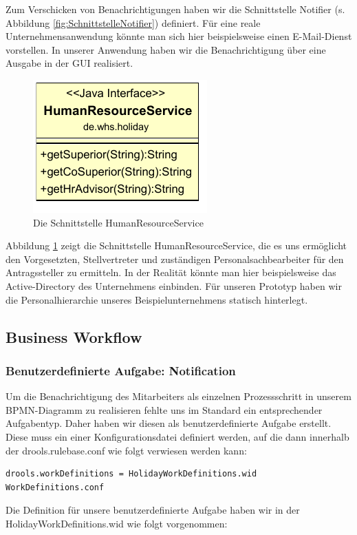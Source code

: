 Zum Verschicken von Benachrichtigungen haben wir die Schnittstelle Notifier (s. Abbildung \ref{fig:SchnittstelleNotifier}) definiert. Für eine reale Unternehmensanwendung könnte man sich hier beispielsweise einen E-Mail-Dienst vorstellen. In unserer Anwendung haben wir die Benachrichtigung über eine Ausgabe in der GUI realisiert.

\begin{figure}[H]
\centering
\includegraphics[width=0.3\linewidth]{Bilder/SchnittstelleHumanResourceService}
\caption{Die Schnittstelle HumanResourceService}
\label{fig:SchnittstelleHumanResourceService}
\end{figure}

Abbildung \ref{fig:SchnittstelleHumanResourceService} zeigt die Schnittstelle HumanResourceService, die es uns ermöglicht den Vorgesetzten, Stellvertreter und zuständigen Personalsachbearbeiter für den Antragssteller zu ermitteln. In der Realität könnte man hier beispielsweise das Active-Directory des Unternehmens einbinden. Für unseren Prototyp haben wir die Personalhierarchie unseres Beispielunternehmens statisch hinterlegt.

\subsection{Business Workflow}

\subsubsection{Benutzerdefinierte Aufgabe: Notification}
Um die Benachrichtigung des Mitarbeiters als einzelnen Prozessschritt in unserem BPMN-Diagramm zu realisieren fehlte uns im Standard ein entsprechender Aufgabentyp. Daher haben wir diesen als benutzerdefinierte Aufgabe erstellt. Diese muss ein einer Konfigurationsdatei definiert werden, auf die dann innerhalb der drools.rulebase.conf wie folgt verwiesen werden kann:
\begin{lstlisting}
drools.workDefinitions = HolidayWorkDefinitions.wid WorkDefinitions.conf
\end{lstlisting}

Die Definition für unsere benutzerdefinierte Aufgabe haben wir in der HolidayWorkDefinitions.wid wie folgt vorgenommen:

